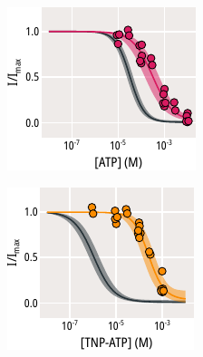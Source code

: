 \begin{figure}[hbtp]
	\centering
	\begin{subfigure}[t]{0.35\textwidth}
		\caption{}\label{ch6fig:nosur_atp}
		\centering
		\includegraphics[width=\textwidth]{nosur_atp.pdf}
	\end{subfigure}
	\hfill
	\begin{subfigure}[t]{0.35\textwidth}
		\caption{}\label{ch6fig:nosur_tnpatp}
		\centering
		\includegraphics[width=\textwidth]{nosur_tnpatp.pdf}

\end{subfigure}
\end{figure}
